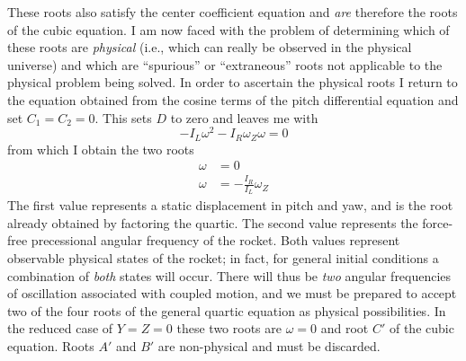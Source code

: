 These roots also satisfy the center coefficient equation and \emph{are}
therefore the roots of the cubic equation. I am now faced with the problem of
determining which of these roots are \emph{physical} (i.e., which can really
be observed in the physical universe) and which are ``spurious'' or
``extraneous'' roots not applicable to the physical problem being solved. In
order to ascertain the physical roots I return to the equation obtained from
the cosine terms of the pitch differential equation and set $C_1 = C_2 = 0$.
This sets $D$ to zero and leaves me with
\begin{equation*}
-I_L\omega^2 - I_R\omega_Z\omega = 0
\end{equation*}
from which I obtain the two roots
\begin{align*}
\omega &= 0\\
\omega &= -\frac{I_R}{I_L}\omega_Z
\end{align*}
The first value represents a static displacement in pitch and yaw, and is the
root already obtained by factoring the quartic. The second value represents
the force-free precessional angular frequency of the rocket. Both values
represent observable physical states of the rocket; in fact, for general
initial conditions a combination of \emph{both} states will occur. There will
thus be \emph{two} angular frequencies of oscillation associated with coupled
motion, and we must be prepared to accept two of the four roots of the general
quartic equation as physical possibilities. In the reduced case of $Y = Z = 0$
these two roots are $\omega = 0$ and root $C'$ of the cubic equation. Roots
$A'$ and $B'$ are non-physical and must be discarded.


